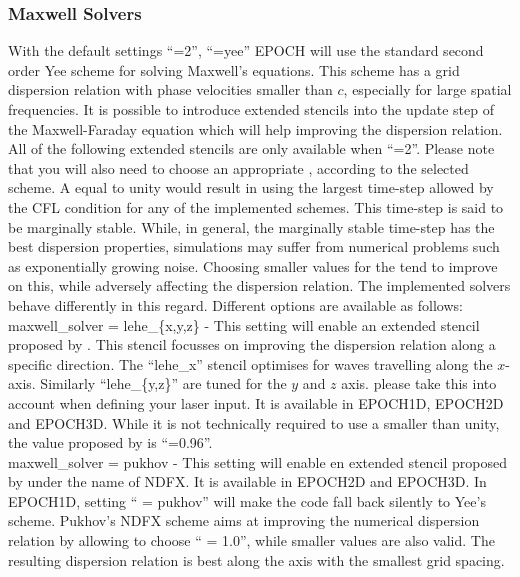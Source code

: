 \subsubsection{Maxwell Solvers}
\label{sec:maxwell_solvers}
With the default settings ``=2'',
``=yee'' EPOCH will use the standard second order
Yee scheme for solving Maxwell's equations.
This scheme has a grid dispersion relation with phase velocities smaller than
$c$, especially for large spatial frequencies.
It is possible to introduce extended stencils into the update step of the
Maxwell-Faraday equation which will help improving the dispersion relation.
All of the following extended stencils are only available when
``=2''.
Please note that you will also need to choose an appropriate
, according to the selected scheme.
A  equal to unity would result in using the largest
time-step allowed by the CFL condition for any of the implemented schemes.
This time-step is said to be marginally stable.
While, in general, the marginally stable time-step has the best dispersion
properties, simulations may suffer from numerical problems such as
exponentially growing noise.
Choosing smaller values for the  tend to improve on
this, while adversely affecting the dispersion relation.
The implemented solvers behave differently in this regard.
Different options are available as follows:\\

{\emphtext maxwell\_solver = lehe\_\{x,y,z\}} - This setting will enable an
extended
stencil proposed by \citet{Lehe2013}.
This stencil focusses on improving the dispersion relation along a specific
direction. The ``lehe\_x'' stencil optimises for waves travelling along the
$x$-axis. Similarly ``lehe\_\{y,z\}'' are tuned for the $y$ and $z$ axis.
please take this into account when defining your laser input.
It is available in EPOCH1D, EPOCH2D and EPOCH3D.
While it is not technically required to use a 
smaller than unity, the value proposed by \citet{Lehe2013} is
``=0.96''. \\

{\emphtext maxwell\_solver = pukhov} - This setting will enable en extended
stencil proposed by \citet{Pukhov1999} under the name of NDFX.
It is available in EPOCH2D and EPOCH3D. In EPOCH1D, setting
`` = pukhov'' will make the code fall back silently
to Yee's scheme. Pukhov's NDFX scheme aims at improving the
numerical dispersion relation by allowing to choose
`` = 1.0'', while smaller values are also valid.
The resulting dispersion relation is best along the axis with the smallest grid
spacing.\\

